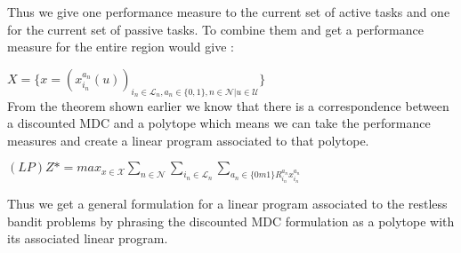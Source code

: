 Thus we give one performance measure to the current set of active tasks and one for the current set of passive tasks. To combine them and get a performance measure for the entire region would give : 


$X = \{x = (x_{i_n}^{a_n}(u))_{i_n \in \mathcal{L}_n, a_n \in \{0,1\}, n \in \mathcal{N}|u \in \mathcal{U}}\}$\\

From the theorem shown earlier we know that there is a correspondence between a discounted MDC and a polytope which means we can take the performance measures and create a linear program associated to that polytope.

$(LP) Z* = max_{x \in \mathcal{X}} \sum_{n \in \mathcal{N}} \sum_{i_n \in \mathcal{L}_n} 
\sum_{a_n \in \{ 0m1\} R_{i_n}^{a_n} x_{i_n}^{a_n}} $

Thus we get a general formulation for a linear program associated to the restless bandit problems by phrasing the discounted MDC formulation as a polytope with its associated linear program. 
